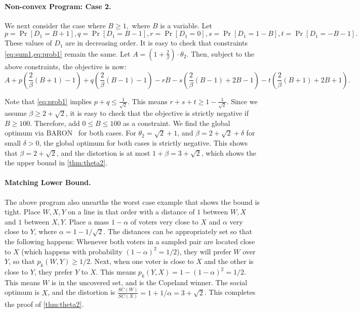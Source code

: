 \paragraph{Non-convex Program: Case 2.} We next consider the case where 
 $B \ge 1,$ where $B$ is a variable. Let 
$$p = \Pr[D_1 = B+1], q = \Pr[D_1= B-1], r = \Pr[ D_1 = 0], s = \Pr[D_1 = 1-B], t = \Pr[D_1 = -B-1].$$ 
These values of $D_1$ are in decreasing order. It is easy to check that constraints \cref{eq:sum1,eq:prob1} remain the same.
Let $A = \left(1 + \frac{2}{\beta}\right) \cdot \theta_2$. Then, subject to the above constraints, the objective is now:
$$ A +  p \left(\frac{2}{\beta}(B+1) - 1\right) + q \left(\frac{2}{\beta}(B-1) - 1\right) - r B - s\left( \frac{2}{\beta} (B-1)+2B-1\right) - t \left( \frac{2}{\beta}(B+1) + 2B + 1 \right). $$


Note that \cref{eq:prob1} implies $p+q \le \frac{1}{\sqrt{2}}$. This means $r + s + t \ge 1 - \frac{1}{\sqrt{2}}$. Since we assume $\beta \ge 2 + \sqrt{2}$, it is easy to check that the objective is strictly negative if $B \ge 100$. Therefore, add $0 \le B \le 100$ as a constraint. We find the global optimum via BARON~\cite{Sahinidis1996,KS18} for both cases. For $\theta_2 = \sqrt{2} + 1$, and $\beta = 2 + \sqrt{2} + \delta$ for small $\delta > 0$, the global optimum for both cases is strictly negative. This shows that $\beta = 2 + \sqrt{2}$, and the distortion is at most $1+\beta = 3 + \sqrt{2}$, which shows the the upper bound in \cref{thm:theta2}.


\paragraph{Matching Lower Bound.} The above program also unearths the worst case example that shows the bound is tight.  Place $W,X,Y$ on a line in that order with a distance of $1$ between $W,X$ and $1$ between $X,Y$. Place a mass $1-\alpha$ of voters very close to  $X$ and $\alpha$ very close to $Y$, where $\alpha = 1 - 1/\sqrt{2}$. The distances can be appropriately set so that the following happens: Whenever both voters in a sampled pair are located close to $X$ (which happens with probability $(1-\alpha)^2 = 1/2$), they will prefer $W$ over $Y$, so that $p_k(W,Y) \ge 1/2$. Next, when one voter is close to $X$ and the other is close to $Y$, they prefer $Y$ to $X$. This means $p_k(Y,X) = 1 - (1-\alpha)^2 = 1/2$. This means $W$ is in the uncovered set, and is the Copeland winner. The social optimum is $X$, and the distortion is $\frac{SC(W)}{SC(X)} = 1+1/\alpha = 3 + \sqrt{2}$. This completes the proof of \cref{thm:theta2}.
